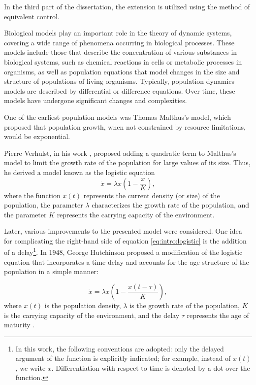 In the third part of the dissertation, the extension is utilized using the method of equivalent control.

{\actuality} Biological models play an important role in the theory of dynamic systems, covering a wide range of phenomena occurring in biological processes. These models include those that describe the concentration of various substances in biological systems, such as chemical reactions in cells or metabolic processes in organisms, as well as population equations that model changes in the size and structure of populations of living organisms. Typically, population dynamics models are described by differential or difference equations. Over time, these models have undergone significant changes and complexities.

One of the earliest population models was Thomas Malthus's model, which proposed that population growth, when not constrained by resource limitations, would be exponential.

Pierre Verhulst, in his work \cite{Verhulst1838}, proposed adding a quadratic term to Malthus's model to limit the growth rate of the population for large values of its size. Thus, he derived a model known as the logistic equation
\begin{equation}
\label{eq:intro:logistic}
	\dot{x}=\lambda x\left(1-\frac{x}{K}\right),
\end{equation}
where the function $x(t)$ represents the current density (or size) of the population, the parameter $\lambda$ characterizes the growth rate of the population, and the parameter $K$ represents the carrying capacity of the environment.

Later, various improvements to the presented model were considered. One idea for complicating the right-hand side of equation \eqref{eq:intro:logistic} is the addition of a delay\footnote{In this work, the following conventions are adopted: only the delayed argument of the function is explicitly indicated; for example, instead of $x(t)$, we write $x$. Differentiation with respect to time is denoted by a dot over the function.}. In 1948, George Hutchinson proposed a modification of the logistic equation that incorporates a time delay and accounts for the age structure of the population in a simple manner:

\begin{equation}
	\label{eq:intro:hutch}
	\dot{x} = \lambda x\left(1 - \frac{x(t - \tau)}{K}\right),
\end{equation}
%
where $x(t)$ is the population density, $\lambda$ is the growth rate of the population, $K$ is the carrying capacity of the environment, and the delay $\tau$ represents the age of maturity \cite{Hutchinson1948}. %



